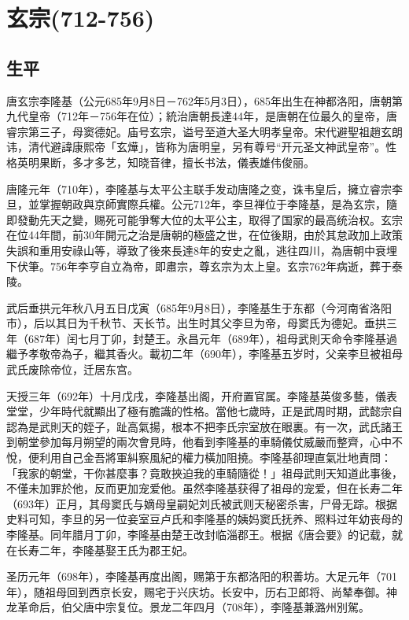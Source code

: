 
\section{玄宗\tiny(712-756)}

\subsection{生平}

唐玄宗李隆基（公元685年9月8日－762年5月3日），685年出生在神都洛阳，唐朝第九代皇帝（712年－756年在位）；統治唐朝長達44年，是唐朝在位最久的皇帝，唐睿宗第三子，母窦德妃。庙号玄宗，谥号至道大圣大明孝皇帝。宋代避聖祖趙玄朗讳，清代避諱康熙帝「玄燁」，皆称为唐明皇，另有尊号“开元圣文神武皇帝”。性格英明果断，多才多艺，知晓音律，擅长书法，儀表雄伟俊丽。

唐隆元年（710年），李隆基与太平公主联手发动唐隆之变，诛韦皇后，擁立睿宗李旦，並掌握朝政與京師實際兵權。公元712年，李旦禅位于李隆基，是為玄宗，隨即發動先天之變，赐死可能爭奪大位的太平公主，取得了国家的最高统治权。玄宗在位44年間，前30年開元之治是唐朝的極盛之世，在位後期，由於其怠政加上政策失誤和重用安祿山等，導致了後來長達8年的安史之亂，逃往四川，為唐朝中衰埋下伏筆。756年李亨自立為帝，即肅宗，尊玄宗为太上皇。玄宗762年病逝，葬于泰陵。

武后垂拱元年秋八月五日戊寅（685年9月8日），李隆基生于东都（今河南省洛阳市），后以其日为千秋节、天长节。出生时其父李旦为帝，母窦氏为德妃。垂拱三年（687年）闰七月丁卯，封楚王。永昌元年（689年），祖母武則天命令李隆基過繼予孝敬帝為子，繼其香火。載初二年（690年），李隆基五岁时，父亲李旦被祖母武氏废除帝位，迁居东宫。

天授三年（692年）十月戊戌，李隆基出阁，开府置官属。李隆基英俊多藝，儀表堂堂，少年時代就顯出了極有膽識的性格。當他七歲時，正是武周时期，武懿宗自認為是武則天的姪子，趾高氣揚，根本不把李氏宗室放在眼裏。有一次，武氏諸王到朝堂參加每月朔望的兩次會見時，他看到李隆基的車騎儀仗威嚴而整齊，心中不悅，便利用自己金吾將軍糾察風紀的權力橫加阻撓。李隆基卻理直氣壯地責問：「我家的朝堂，干你甚麼事？竟敢挾迫我的車騎隨從！」祖母武則天知道此事後，不僅未加罪於他，反而更加宠爱他。虽然李隆基获得了祖母的宠爱，但在长寿二年（693年）正月，其母窦氏与嫡母皇嗣妃刘氏被武则天秘密杀害，尸骨无踪。根据史料可知，李旦的另一位妾室豆卢氏和李隆基的姨妈窦氏抚养、照料过年幼丧母的李隆基。同年腊月丁卯，李隆基由楚王改封临淄郡王。根据《唐会要》的记载，就在长寿二年，李隆基娶王氏为郡王妃。

圣历元年（698年），李隆基再度出阁，赐第于东都洛阳的积善坊。大足元年（701年），随祖母回到西京长安，赐宅于兴庆坊。长安中，历右卫郎将、尚辇奉御。神龙革命后，伯父唐中宗复位。景龙二年四月（708年），李隆基兼潞州別駕。

